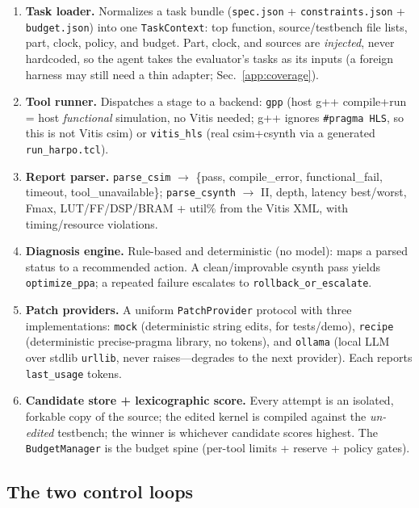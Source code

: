\begin{enumerate}
  \item \textbf{Task loader.} Normalizes a task bundle
    (\texttt{spec.json} + \texttt{constraints.json} +
    \texttt{budget.json}) into one \texttt{TaskContext}: top function,
    source/testbench file lists, part, clock, policy, and budget. Part,
    clock, and sources are \emph{injected}, never hardcoded, so the
    agent takes the evaluator's tasks as its inputs (a foreign harness may
    still need a thin adapter; Sec.~\ref{app:coverage}).
  \item \textbf{Tool runner.} Dispatches a stage to a backend:
    \texttt{gpp} (host g++ compile+run = host \emph{functional} simulation, no Vitis
    needed; g++ ignores \texttt{\#pragma HLS}, so this is not Vitis csim) or
    \texttt{vitis\_hls} (real csim+csynth via a generated
    \texttt{run\_harpo.tcl}).
  \item \textbf{Report parser.} \texttt{parse\_csim} $\rightarrow$
    \{pass, compile\_error, functional\_fail, timeout,
    tool\_unavailable\}; \texttt{parse\_csynth} $\rightarrow$ II, depth,
    latency best/worst, Fmax, LUT/FF/DSP/BRAM + util\% from the Vitis
    XML, with timing/resource violations.
  \item \textbf{Diagnosis engine.} Rule-based and deterministic (no
    model): maps a parsed status to a recommended action. A
    clean/improvable csynth pass yields \texttt{optimize\_ppa}; a
    repeated failure escalates to \texttt{rollback\_or\_escalate}.
  \item \textbf{Patch providers.} A uniform \texttt{PatchProvider}
    protocol with three implementations: \texttt{mock} (deterministic
    string edits, for tests/demo), \texttt{recipe} (deterministic
    precise-pragma library, no tokens), and \texttt{ollama} (local LLM
    over stdlib \texttt{urllib}, never raises---degrades to the next
    provider). Each reports \texttt{last\_usage} tokens.
  \item \textbf{Candidate store + lexicographic score.} Every attempt
    is an isolated, forkable copy of the source; the edited kernel is
    compiled against the \emph{un-edited} testbench; the winner is
    whichever candidate scores highest. The \texttt{BudgetManager} is
    the budget spine (per-tool limits + reserve + policy gates).
\end{enumerate}

\subsection{The two control loops}\label{app:arch:loops}


